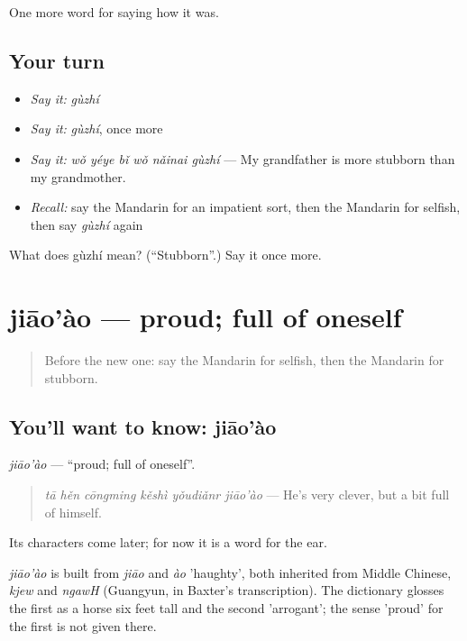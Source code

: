 \begin{grammarlens}[title={What you've built}]
One more word for saying how it was.
\end{grammarlens}

\subsection*{Your turn}
\begin{itemize}
\raggedright
  \item \emph{Say it:} \emph{gùzhí}
  \item \emph{Say it:} \emph{gùzhí}, once more
  \item \emph{Say it:} \emph{wǒ yéye bǐ wǒ nǎinai gùzhí} — My grandfather is more stubborn than my grandmother.
  \item \emph{Recall:} say the Mandarin for an impatient sort, then the Mandarin for selfish, then say \emph{gùzhí} again
\end{itemize}

\begin{tcolorbox}[breakable,colback=teal!4,colframe=teal!35!black,title={Before you move on}]
What does gùzhí mean? (\textquotedblleft{}Stubborn\textquotedblright{}.) Say it once more.
\end{tcolorbox}
\section[jiāo'ào]{jiāo'ào — proud; full of oneself}

\label{lesson:ZH-C470-jiaoao}



\begin{quote}
Before the new one: say the Mandarin for selfish, then the Mandarin for stubborn.
\end{quote}

\subsection*{You'll want to know: jiāo'ào}
\emph{jiāo'ào} — \textquotedblleft{}proud; full of oneself\textquotedblright{}.

\begin{quote}
\emph{tā hěn cōngming kěshì yǒudiǎnr jiāo'ào} — He's very clever, but a bit full of himself.
\end{quote}

Its characters come later; for now it is a word for the ear.

\begin{cousinweb}
\emph{jiāo'ào} is built from \emph{jiāo} and \emph{ào} 'haughty', both inherited from Middle Chinese, \emph{kjew} and \emph{ngawH} (Guangyun, in Baxter's transcription). The dictionary glosses the first as a horse six feet tall and the second 'arrogant'; the sense 'proud' for the first is not given there.
\end{cousinweb}

